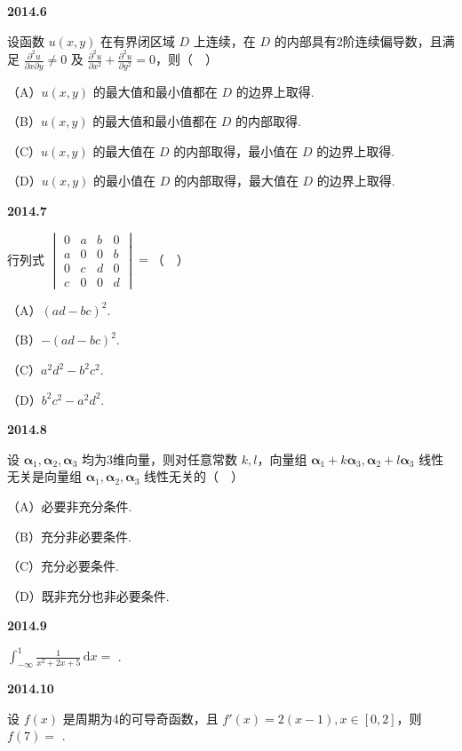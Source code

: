 \documentclass[UTF8,12pt,fontset=windows]{ctexart}
\begin{document}
\vfill
\newpage
{\large\bfseries 2014.6}

设函数 $u(x, y)$ 在有界闭区域 $D$ 上连续，在 $D$ 的内部具有2阶连续偏导数，且满足 $\frac{\partial^2 u}{\partial x \partial y} \neq 0$ 及 $\frac{\partial^2 u}{\partial x^2} + \frac{\partial^2 u}{\partial y^2} = 0$，则（　）

（A）$u(x, y)$ 的最大值和最小值都在 $D$ 的边界上取得.

（B）$u(x, y)$ 的最大值和最小值都在 $D$ 的内部取得.

（C）$u(x, y)$ 的最大值在 $D$ 的内部取得，最小值在 $D$ 的边界上取得.

（D）$u(x, y)$ 的最小值在 $D$ 的内部取得，最大值在 $D$ 的边界上取得.

\vfill
\newpage
{\large\bfseries 2014.7}

行列式 $\begin{vmatrix} 0 & a & b & 0 \\ a & 0 & 0 & b \\ 0 & c & d & 0 \\ c & 0 & 0 & d \end{vmatrix} =$（　）

（A）$(ad - bc)^2$.

（B）$-(ad - bc)^2$.

（C）$a^2d^2 - b^2c^2$.

（D）$b^2c^2 - a^2d^2$.

\vfill
\newpage
{\large\bfseries 2014.8}

设 $\boldsymbol{\alpha}_1, \boldsymbol{\alpha}_2, \boldsymbol{\alpha}_3$ 均为3维向量，则对任意常数 $k, l$，向量组 $\boldsymbol{\alpha}_1 + k\boldsymbol{\alpha}_3, \boldsymbol{\alpha}_2 + l\boldsymbol{\alpha}_3$ 线性无关是向量组 $\boldsymbol{\alpha}_1, \boldsymbol{\alpha}_2, \boldsymbol{\alpha}_3$ 线性无关的（　）

（A）必要非充分条件.

（B）充分非必要条件.

（C）充分必要条件.

（D）既非充分也非必要条件.

\vfill
\newpage
{\large\bfseries 2014.9}

$\int_{-\infty}^{1} \frac{1}{x^2 + 2x + 5}\,\mathrm{d}x =$ \underline{\hspace{20mm}}.

\vfill
\newpage
{\large\bfseries 2014.10}

设 $f(x)$ 是周期为4的可导奇函数，且 $f'(x) = 2(x - 1), x \in [0, 2]$，则 $f(7) =$ \underline{\hspace{20mm}}.
\end{document}
